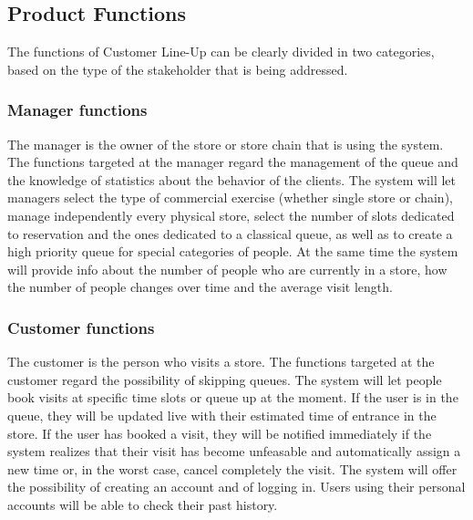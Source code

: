 \subsection{Product Functions}
The functions of Customer Line-Up can be clearly divided in two categories, based on the type of the stakeholder that is being addressed.

\subsubsection{Manager functions}
The manager is the owner of the store or store chain that is using the system.
The functions targeted at the manager regard the management of the queue and the knowledge of statistics about the behavior of the clients.
The system will let managers select the type of commercial exercise (whether single store or chain), manage independently every physical store,
select the number of slots dedicated to reservation and the ones dedicated to a classical queue,
as well as to create a high priority queue for special categories of people.
At the same time the system will provide info about the number of people who are currently in a store,
how the number of people changes over time and the average visit length.

\subsubsection{Customer functions}
The customer is the person who visits a store.
The functions targeted at the customer regard the possibility of skipping queues.
The system will let people book visits at specific time slots or queue up at the moment.
If the user is in the queue, they will be updated live with their estimated time of entrance in the store.
If the user has booked a visit, they will be notified immediately if the system realizes that
their visit has become unfeasable and automatically assign a new time or, in the worst case, cancel completely the visit.
The system will offer the possibility of creating an account and of logging in.
Users using their personal accounts will be able to check their past history.

